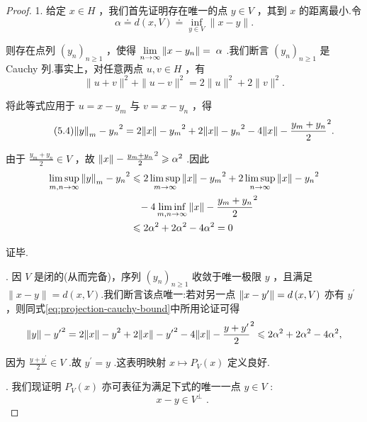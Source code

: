 \begin{proof}
1. 给定 $x \in  H$ ，我们首先证明存在唯一的点 $y \in  V$ ，其到 $x$ 的距离最小.令
\[
\alpha  \doteq  d\left( {x,V}\right)  \doteq  \mathop{\inf }\limits_{{y \in  V}}\| x - y\| .
\]

则存在点列 ${\left( {y}_{n}\right) }_{n \geq  1}$ ，使得 $\mathop{\lim }\limits_{{n \rightarrow  \infty }}\norm{x - {y}_{n}} = \; \alpha$ .我们断言 ${\left( {y}_{n}\right) }_{n \geq  1}$ 是 Cauchy 列.事实上，对任意两点 $u,v \in  H$ ，有
\[
\| u + v{\| }^{2} + \| u - v{\| }^{2} = 2\| u{\| }^{2} + 2\| v{\| }^{2}.
\]

将此等式应用于 $u = x - {y}_{m}$ 与 $v = x - {y}_{n}$ ，得
\begin{equation}\tag{5.4}\label{eq:projection-cauchy-bound}
{\norm{y}_{m} - {y}_{n}}^{2} = 2{\norm{x} - {y}_{m}}^{2} + 2{\norm{x} - {y}_{n}}^{2} - 4{\norm{x} - \frac{{y}_{m} + {y}_{n}}{2}}^{2}.
\end{equation}

由于 $\frac{{y}_{m} + {y}_{n}}{2} \in  V$ ，故 ${\norm{x} - \frac{{y}_{m} + {y}_{n}}{2}}^{2} \geqslant  {\alpha }^{2}$ .因此
{\setjot[-2]\begin{align*}
    \mathop{\limsup }\limits_{{m,n \rightarrow  \infty }}{\norm{y}_{m} - {y}_{n}}^{2} &\leqslant  2\mathop{\limsup }\limits_{{m \rightarrow  \infty }}{\norm{x} - {y}_{m}}^{2} + 2\mathop{\limsup }\limits_{{n \rightarrow  \infty }}{\norm{x} - {y}_{n}}^{2}\\
    &\;\;\;- 4\mathop{\liminf }\limits_{{m,n \rightarrow  \infty }}{\norm{x} - \frac{{y}_{m} + {y}_{n}}{2}}^{2} \\
    &\leqslant  2{\alpha }^{2} + 2{\alpha }^{2} - 4{\alpha }^{2} = 0
\end{align*}}

证毕.

. 因 $V$ 是闭的(从而完备)，序列 ${\left( {y}_{n}\right) }_{n \geq  1}$ 收敛于唯一极限 $y$ ，且满足 $\| x - y\|  = d\left( {x,V}\right)$.我们断言该点唯一:若对另一点 $\norm{x - {y}^{\prime }} = d\left( {x,V}\right)$ 亦有 ${y}^{\prime }$ ，则同式\eqref{eq:projection-cauchy-bound}中所用论证可得
\[
{\norm{y} - {y}^{\prime }}^{2} = 2{\norm{x} - y}^{2} + 2{\norm{x} - {y}^{\prime }}^{2} - 4{\norm{x} - \frac{y + {y}^{\prime }}{2}}^{2} \leqslant  2{\alpha }^{2} + 2{\alpha }^{2} - 4{\alpha }^{2},
\]

因为 $\frac{y + {y}^{\prime }}{2} \in  V$ .故 ${y}^{\prime } = y$ .这表明映射 $x \mapsto  {P}_{V}\left( x\right)$ 定义良好.

. 我们现证明 ${P}_{V}\left( x\right)$ 亦可表征为满足下式的唯一一点 $y \in  V$ :
\begin{equation}\tag{5.5}\label{eq:projection-orthogonality}
x - y \in  {V}^{ \bot  }\text{ . }
\end{equation}


\end{proof}
